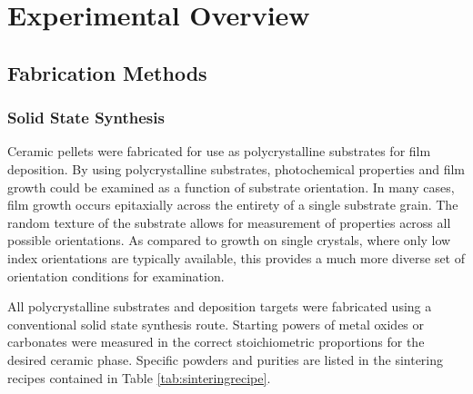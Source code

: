 

\chapter{Experimental Overview}
\label{ch:experimental}




\section{Fabrication Methods}
\label{sec:exp.fabrication}


\subsection{Solid State Synthesis}
\label{subsec:exp.solidstate}


Ceramic pellets were fabricated for use as polycrystalline substrates for film deposition. By using polycrystalline substrates, photochemical properties and film growth could be examined as a function of substrate orientation. In many cases, film growth occurs epitaxially across the entirety of a single substrate grain. The random texture of the substrate allows for measurement of properties across all possible orientations. As compared to growth on single crystals, where only low index orientations are typically available, this provides a much more diverse set of orientation conditions for examination. 

All polycrystalline substrates and deposition targets were fabricated using a conventional solid state synthesis route. Starting powers of metal oxides or carbonates were measured in the correct stoichiometric proportions for the desired ceramic phase. Specific powders and purities are listed in the sintering recipes contained in Table \ref{tab:sinteringrecipe}.
 
